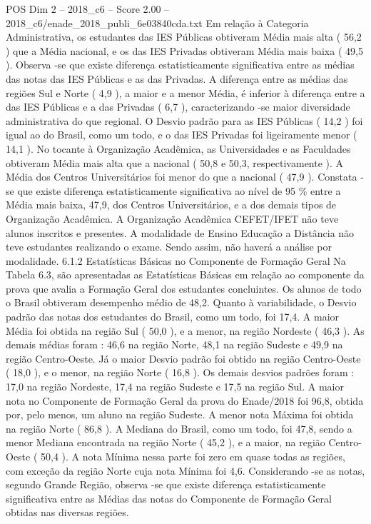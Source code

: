 \begin{textsample}{POS Dim 2 – 2018\_c6 – Score 2.00 – 2018\_c6/enade\_2018\_publi\_6e03840cda.txt}
Em relação à Categoria Administrativa, os estudantes das IES Públicas obtiveram Média mais alta ( 56,2 ) que a Média nacional, e os das IES Privadas obtiveram Média mais baixa ( 49,5 ).
Observa -se que existe diferença estatisticamente significativa entre as médias das notas das IES Públicas e as das Privadas.
A diferença entre as médias das regiões Sul e Norte ( 4,9 ), a maior e a menor Média, é inferior à diferença entre a das IES Públicas e a das Privadas ( 6,7 ), caracterizando -se maior diversidade administrativa do que regional.
O Desvio padrão para as IES Públicas ( 14,2 ) foi igual ao do Brasil, como um todo, e o das IES Privadas foi ligeiramente menor ( 14,1 ).
No tocante à Organização Acadêmica, as Universidades e as Faculdades obtiveram Média mais alta que a nacional ( 50,8 e 50,3, respectivamente ).
A Média dos Centros Universitários foi menor do que a nacional ( 47,9 ).
Constata -se que existe diferença estatisticamente significativa ao nível de 95 \% entre a Média mais baixa, 47,9, dos Centros Universitários, e a dos demais tipos de Organização Acadêmica.
A Organização Acadêmica CEFET/IFET não teve alunos inscritos e presentes.
A modalidade de Ensino Educação a Distância não teve estudantes realizando o exame.
Sendo assim, não haverá a análise por modalidade. 6.1.2 Estatísticas Básicas no Componente de Formação Geral Na Tabela 6.3, são apresentadas as Estatísticas Básicas em relação ao componente da prova que avalia a Formação Geral dos estudantes concluintes.
Os alunos de todo o Brasil obtiveram desempenho médio de 48,2.
Quanto à variabilidade, o Desvio padrão das notas dos estudantes do Brasil, como um todo, foi 17,4.
A maior Média foi obtida na região Sul ( 50,0 ), e a menor, na região Nordeste ( 46,3 ).
As demais médias foram : 46,6 na região Norte, 48,1 na região Sudeste e 49,9 na região Centro-Oeste.
Já o maior Desvio padrão foi obtido na região Centro-Oeste ( 18,0 ), e o menor, na região Norte ( 16,8 ).
Os demais desvios padrões foram : 17,0 na região Nordeste, 17,4 na região Sudeste e 17,5 na região Sul.
A maior nota no Componente de Formação Geral da prova do Enade/2018 foi 96,8, obtida por, pelo menos, um aluno na região Sudeste.
A menor nota Máxima foi obtida na região Norte ( 86,8 ).
A Mediana do Brasil, como um todo, foi 47,8, sendo a menor Mediana encontrada na região Norte ( 45,2 ), e a maior, na região Centro-Oeste ( 50,4 ).
A nota Mínima nessa parte foi zero em quase todas as regiões, com exceção da região Norte cuja nota Mínima foi 4,6.
Considerando -se as notas, segundo Grande Região, observa -se que existe diferença estatisticamente significativa entre as Médias das notas do Componente de Formação Geral obtidas nas diversas regiões.

\end{textsample}
